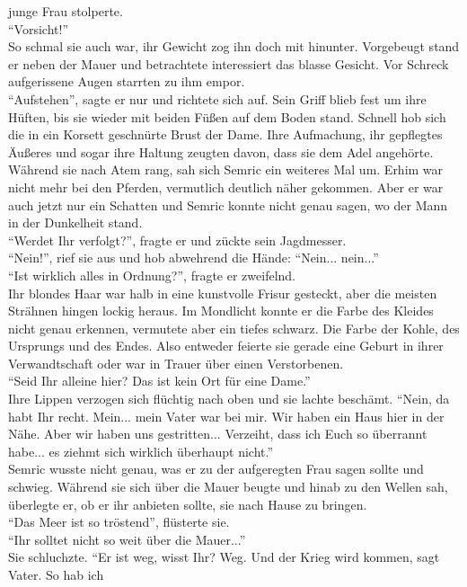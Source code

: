junge Frau stolperte. \\
``Vorsicht!''\\
So schmal sie auch war, ihr Gewicht zog ihn doch mit hinunter. Vorgebeugt stand er neben der Mauer 
und betrachtete interessiert das blasse Gesicht. Vor Schreck aufgerissene Augen starrten zu ihm 
empor. \\
``Aufstehen'', sagte er nur und richtete sich auf. Sein Griff blieb fest um ihre Hüften, bis sie 
wieder mit beiden Füßen auf dem Boden stand. Schnell hob sich die in ein Korsett geschnürte Brust 
der Dame. Ihre Aufmachung, ihr gepflegtes Äußeres und sogar ihre Haltung zeugten davon, dass sie 
dem Adel angehörte. Während sie nach Atem rang, sah sich Semric ein weiteres Mal um. Erhim war 
nicht mehr bei den Pferden, vermutlich deutlich näher gekommen. Aber er war auch jetzt nur ein 
Schatten und Semric konnte nicht genau sagen, wo der Mann in der Dunkelheit stand.\\
``Werdet Ihr verfolgt?'', fragte er und zückte sein Jagdmesser.\\
``Nein!'', rief sie aus und hob abwehrend die Hände: ``Nein... nein...''\\
``Ist wirklich alles in Ordnung?'', fragte er zweifelnd.\\
Ihr blondes Haar war halb in eine kunstvolle Frisur gesteckt, aber die meisten Strähnen hingen 
lockig heraus. Im Mondlicht konnte er die Farbe des Kleides nicht genau erkennen, vermutete aber 
ein tiefes schwarz. Die Farbe der Kohle, des Ursprungs und des Endes. Also entweder feierte sie 
gerade eine Geburt in ihrer Verwandtschaft oder war in Trauer über einen Verstorbenen.\\
``Seid Ihr alleine hier? Das ist kein Ort für eine Dame.''\\
Ihre Lippen verzogen sich flüchtig nach oben und sie lachte beschämt. ``Nein, da habt Ihr recht. 
Mein... mein Vater war bei mir. Wir haben ein Haus hier in der Nähe. Aber wir haben uns 
gestritten... Verzeiht, dass ich Euch so überrannt habe... es ziehmt sich wirklich überhaupt 
nicht.''\\
Semric wusste nicht genau, was er zu der aufgeregten Frau sagen sollte und schwieg. Während sie 
sich über die Mauer beugte und hinab zu den Wellen sah, überlegte er, ob er ihr anbieten sollte, 
sie nach Hause zu bringen.\\
``Das Meer ist so tröstend'', flüsterte sie.\\
``Ihr solltet nicht so weit über die Mauer...''\\
Sie schluchzte. ``Er ist weg, wisst Ihr? Weg. Und der Krieg wird kommen, sagt Vater. So hab ich 
